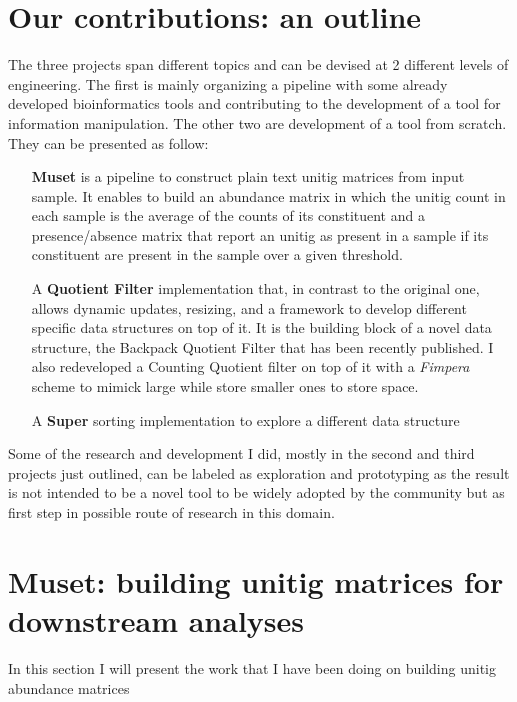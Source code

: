 \section{Our contributions: an outline}
The three projects span different topics and can be devised at 2 different levels of engineering. The first is mainly organizing a pipeline with some already developed bioinformatics tools and contributing to the development of a tool for \kmer information manipulation. The other two are development of a tool from scratch.\\
They can be presented as follow:
\begin{itemize}
	\item[\textbf{Muset}] is a pipeline to construct plain text unitig matrices from input sample. It enables to build an abundance matrix in which the unitig count in each sample is the average of the counts of its constituent \kmers and a presence/absence matrix that report an unitig as present in a sample if its constituent \kmers are present in the sample over a given threshold.\\
	\item[A \textbf{Quotient Filter}] implementation that, in contrast to the original one, allows dynamic updates, resizing, and a framework to develop different specific data structures on top of it. It is the building block of a novel data structure, the Backpack Quotient Filter that has been recently published. I also redeveloped a Counting Quotient filter on top of it with a \emph{Fimpera} scheme to mimick large \kmers while store smaller ones to store space.\\ 
	\item[A \textbf{Super\kmer} sorting] implementation to explore a different data structure 
\end{itemize}
Some of the research and development I did, mostly in the second and third projects just outlined, can be labeled as exploration and prototyping as the result is not intended to be a novel tool to be widely adopted by the community but as first step in possible route of research in this domain.

\section{Muset: building unitig matrices for downstream analyses}
In this section I will present the work that I have been doing on building unitig abundance matrices
